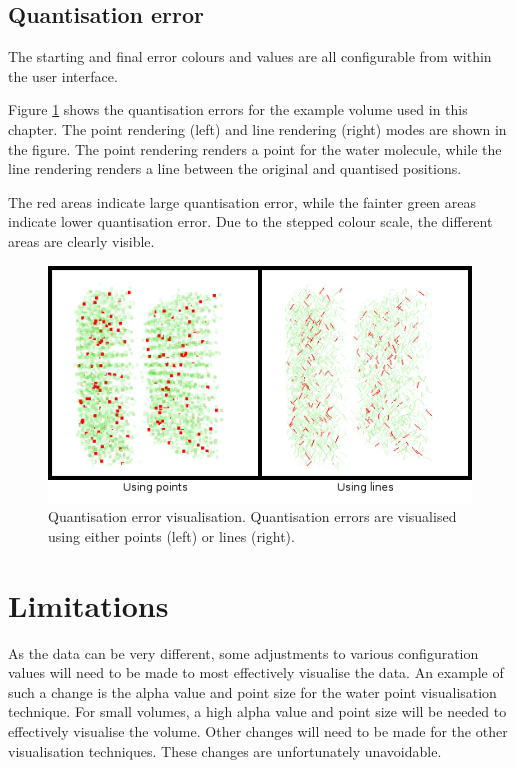 
\subsection*{Quantisation error}

The starting and final error colours and values are all configurable from
within the user interface.

Figure \ref{fig:implementation_quanterror} shows the quantisation errors for
the example volume used in this chapter. The point rendering (left) and line
rendering (right) modes are shown in the figure. The point rendering renders a
point for the water molecule, while the line rendering renders a line between
the original and quantised positions.

The red areas indicate large quantisation error, while the fainter green areas
indicate lower quantisation error. Due to the stepped colour scale, the
different areas are clearly visible.

\begin{figure}
  \begin{center}
    \includegraphics[width=120mm]{quanterror}
  \end{center}
  \caption{Quantisation error visualisation. Quantisation errors are visualised
  using either points (left) or lines (right).}
  \label{fig:implementation_quanterror}
\end{figure}



\section{Limitations}
\label{sec:implementation_limitations}

As the data can be very different, some adjustments to various configuration
values will need to be made to most effectively visualise the data. An example
of such a change is the alpha value and point size for the water point
visualisation technique. For small volumes, a high alpha value and point size
will be needed to effectively visualise the volume. Other changes will need to
be made for the other visualisation techniques. These changes are unfortunately
unavoidable.

